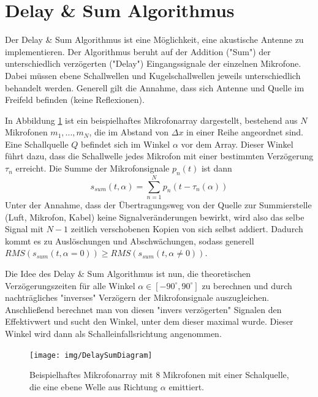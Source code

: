 \section{Delay \& Sum Algorithmus}

	Der Delay \& Sum Algorithmus ist eine Möglichkeit, eine akustische Antenne zu implementieren. Der Algorithmus beruht auf der Addition ("Sum") der unterschiedlich verzögerten ("Delay") Eingangssignale der einzelnen Mikrofone. Dabei müssen ebene Schallwellen und Kugelschallwellen jeweils unterschiedlich behandelt werden. Generell gilt die Annahme, dass sich Antenne und Quelle im Freifeld befinden (keine Reflexionen).
	
	In Abbildung \ref{fig:das_basic} ist ein beispielhaftes Mikrofonarray dargestellt, bestehend aus $N$ Mikrofonen $m_1,...,m_N$, die im Abstand von $\Delta x$ in einer Reihe angeordnet sind. Eine Schallquelle $Q$ befindet sich im Winkel $\alpha$ vor dem Array.
	Dieser Winkel führt dazu, dass die Schallwelle jedes Mikrofon mit einer bestimmten Verzögerung $\tau_n$ erreicht.
	Die Summe der Mikrofonsignale $p_n(t)$ ist dann
	\begin{equation}
		s_{sum}(t, \alpha) = \sum_{n=1}^{N} p_n(t - \tau_n(\alpha))
	\end{equation}
	Unter der Annahme, dass der Übertragungsweg von der Quelle zur Summierstelle (Luft, Mikrofon, Kabel) keine Signalveränderungen bewirkt, wird also das selbe Signal mit $N-1$ zeitlich verschobenen Kopien von sich selbst addiert.
	Dadurch kommt es zu Auslöschungen und Abschwächungen, sodass generell $RMS(s_{sum}(t, \alpha=0)) \ge RMS(s_{sum}(t, \alpha \ne 0))$.
	
	Die Idee des Delay \& Sum Algorithmus ist nun, die theoretischen Verzögerungszeiten für alle Winkel $\alpha \in [-90^{\circ}, 90^{\circ}]$ zu berechnen und durch nachträgliches "inverses" Verzögern der Mikrofonsignale auszugleichen.
	Anschließend berechnet man von diesen "invers verzögerten" Signalen den Effektivwert und sucht den Winkel, unter dem dieser maximal wurde.
	Dieser Winkel wird dann als Schalleinfallsrichtung angenommen.
	
	\begin{figure}[h]
		\begin{center}
		\texttt{[image: img/DelaySumDiagram]}
		\caption{Beispielhaftes Mikrofonarray mit 8 Mikrofonen mit einer Schalquelle, die eine ebene Welle aus Richtung $\alpha$ emittiert.}
		\label{fig:das_basic}
		\end{center}		
	\end{figure}

